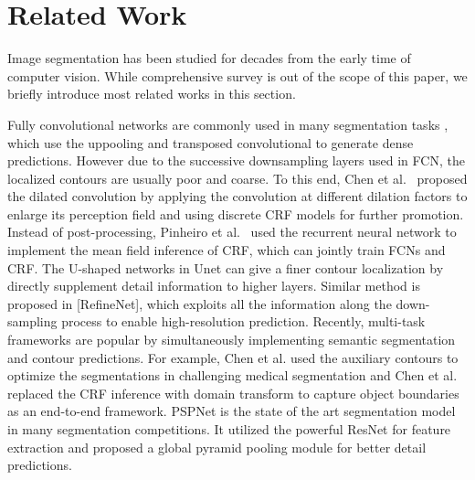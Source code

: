 \section{Related Work}
%
Image segmentation has been studied for decades from the early time of computer vision. While comprehensive survey is out of the scope of this paper, we briefly introduce most related works in this section.

Fully convolutional networks are commonly used in many segmentation tasks \cite{Long2015,Badrinarayanan2015,Noh2015,Ronneberger2015,Chen2016a,Chen2017,Zhao2016}, which use the uppooling \cite{Badrinarayanan2015} and transposed convolutional \cite{Noh2015} to generate dense predictions.
However due to the successive downsampling layers used in FCN, the localized contours are usually poor and coarse.
To this end, Chen et al.~\cite{Chen2016a} proposed the dilated convolution by applying the convolution at different dilation factors to enlarge its perception field and using discrete CRF models for further promotion.
Instead of post-processing, Pinheiro et al.~\cite{Pinheiro2014} used the recurrent neural network to implement the mean field inference of CRF, which can jointly train FCNs and CRF.
The U-shaped networks in Unet \cite{Badrinarayanan2015} can give a finer contour localization by directly supplement detail information to higher layers.
Similar method is proposed in [RefineNet], which exploits all the information along the down-sampling process to enable high-resolution prediction.
Recently, multi-task frameworks are popular by simultaneously implementing semantic segmentation and contour predictions.
For example,  Chen et al.\cite{Chen2017} used the auxiliary contours to optimize the segmentations in challenging medical segmentation and Chen et al.\cite{Chen2016Semantic} replaced the CRF inference with domain transform to capture object boundaries as an end-to-end framework.
PSPNet \cite{Zhao2016} is the state of the art segmentation model in many segmentation competitions.
It utilized the powerful ResNet \cite{He2016} for feature extraction and proposed a global pyramid pooling module for better detail predictions.

